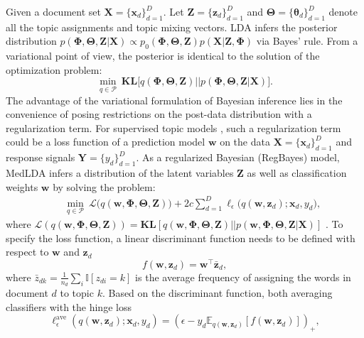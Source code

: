 \documentclass[twoside,11pt]{article}
\newcommand{\xv}{\bm{x}}
\newcommand{\Xv}{\bm{X}}
\newcommand{\Yv}{\bm{Y}}
\newcommand{\zv}{\bm{z}}
\newcommand{\Zv}{\bm{Z}}
\newcommand{\wv}{\bm{w}}
\newcommand{\Thetav}{\bm{\Theta}}
\newcommand{\Phiv}{\bm{\Phi}}
\newcommand{\KL}{\textbf{KL}}
\begin{document}
Given a document set $\Xv = \{\xv_d\}_{d=1}^D$. Let $\bm{Z} = \{\bm{z}_d\}_{d=1}^D$ and $\Thetav = \{\bm{\theta}_d\}_{d=1}^{D}$ denote all the topic assignments and topic mixing vectors. LDA infers the posterior distribution $p( \bm{\Phi}, \bm{\Theta}, \bm{Z} | \bm{X}) \propto p_0(\bm{\Phi}, \bm{\Theta}, \bm{Z}) p(\bm{X} | \bm{Z}, \bm{\Phi})$ via Bayes' rule. From a variational point of view, the posterior is identical to the solution of the optimization problem:
\begin{equation*}%
\min\limits_{q \in \mathcal{P}}~\KL\Big[ q(\Phiv, \Thetav, \Zv) || p(\Phiv, \Thetav, \Zv | \Xv) \Big]. %
\end{equation*}
The advantage of the variational formulation of Bayesian inference lies in the convenience of posing restrictions on the post-data distribution with a regularization term. For supervised topic models \citep{blei2010supervised,zhu2012medlda}, such a regularization term could be a loss function of a prediction model $\bm{w}$ on the data $\Xv = \{\xv_d\}_{d=1}^D$ and response signals $\Yv = \{y_d\}_{d=1}^D$. As a regularized Bayesian (RegBayes) model, MedLDA infers a distribution of the latent variables $\Zv$ as well as classification weights $\wv$ by solving the problem:
\setlength\arraycolsep{-2pt}\begin{eqnarray*}
&& \min\limits_{q \in \mathcal{P}}  ~\mathcal{L}\Big( q(\wv, \Phiv, \Thetav, \Zv) \Big) + 2c \sum\limits_{d=1}^{D}{\ell_{\epsilon}\Big( q(\wv, \zv_d); \xv_d, y_d \Big)},
\end{eqnarray*}
where \small $\mathcal{L}( q(\wv, \Phiv, \Thetav, \Zv) ) = \KL[q(\wv, \Phiv, \Thetav, \Zv) || p(\wv, \Phiv, \Thetav, \Zv | \Xv)]$ \normalsize. To specify the loss function, a linear discriminant function needs to be defined with respect to $\bm{w}$ and $\bm{z}_d$
%
\setlength\arraycolsep{1pt}\begin{equation}\label{eq:disc-func-latent}
f(\wv, \zv_d) = \wv^\top \bar{\zv}_d,
\end{equation}
%
where $\bar{z}_{dk} = \frac{1}{n_d} \sum_i{\mathbb{I}[z_{di} = k]}$ is the average frequency of assigning the words in document $d$ to topic $k$. Based on the discriminant function, both averaging classifiers with the hinge loss
\begin{equation} \label{eq:batch_bayes_loss}
\ell^\text{ave}_{\epsilon}(q(\wv, \zv_d); \xv_d, y_d) = \left( \epsilon - y_d \mathbb{E}_{q(\wv, \zv_d)}[f(\bm{w}, \bm{z}_d)] \right)_+,
\end{equation}
\end{document}
